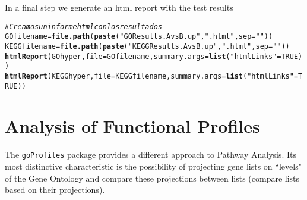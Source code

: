 \documentclass{article}\usepackage[]{graphicx}\usepackage[]{color}
\makeatletter
\newcommand{\hlnum}[1]{\textcolor[rgb]{0.686,0.059,0.569}{#1}}%
\newcommand{\hlstr}[1]{\textcolor[rgb]{0.192,0.494,0.8}{#1}}%
\newcommand{\hlcom}[1]{\textcolor[rgb]{0.678,0.584,0.686}{\textit{#1}}}%
\newcommand{\hlstd}[1]{\textcolor[rgb]{0.345,0.345,0.345}{#1}}%
\newcommand{\hlkwb}[1]{\textcolor[rgb]{0.69,0.353,0.396}{#1}}%
\newcommand{\hlkwc}[1]{\textcolor[rgb]{0.333,0.667,0.333}{#1}}%
\newcommand{\hlkwd}[1]{\textcolor[rgb]{0.737,0.353,0.396}{\textbf{#1}}}%
\newenvironment{kframe}{%
 \def\at@end@of@kframe{}%
 \ifinner\ifhmode%
  \def\at@end@of@kframe{\end{minipage}}%
  \begin{minipage}{\columnwidth}%
 \fi\fi%
 \def\FrameCommand##1{\hskip\@totalleftmargin \hskip-\fboxsep
 \colorbox{shadecolor}{##1}\hskip-\fboxsep
     \hskip-\linewidth \hskip-\@totalleftmargin \hskip\columnwidth}%
 \MakeFramed {\advance\hsize-\width
   \@totalleftmargin\z@ \linewidth\hsize
   \@setminipage}}%
 {\par\unskip\endMakeFramed%
 \at@end@of@kframe}
\newenvironment{knitrout}{}{} %
\makeatother
\begin{document}
In a final step we generate an html report with the test results

\begin{knitrout}
\color{fgcolor}\begin{kframe}
\begin{alltt}
\hlcom{# Creamos un informe html con los resultados}
\hlstd{GOfilename} \hlkwb{=}\hlkwd{file.path}\hlstd{(}\hlkwd{paste}\hlstd{(}\hlstr{"GOResults.AvsB.up"}\hlstd{,}\hlstr{".html"}\hlstd{,} \hlkwc{sep}\hlstd{=}\hlstr{""}\hlstd{))}
\hlstd{KEGGfilename} \hlkwb{=}\hlkwd{file.path}\hlstd{(}\hlkwd{paste}\hlstd{(}\hlstr{"KEGGResults.AvsB.up"}\hlstd{,}\hlstr{".html"}\hlstd{,} \hlkwc{sep}\hlstd{=}\hlstr{""}\hlstd{))}
\hlkwd{htmlReport}\hlstd{(GOhyper,} \hlkwc{file} \hlstd{= GOfilename,} \hlkwc{summary.args}\hlstd{=}\hlkwd{list}\hlstd{(}\hlstr{"htmlLinks"}\hlstd{=}\hlnum{TRUE}\hlstd{))}
\hlkwd{htmlReport}\hlstd{(KEGGhyper,} \hlkwc{file} \hlstd{= KEGGfilename,} \hlkwc{summary.args}\hlstd{=}\hlkwd{list}\hlstd{(}\hlstr{"htmlLinks"}\hlstd{=}\hlnum{TRUE}\hlstd{))}
\end{alltt}
\end{kframe}
\end{knitrout}

\section{Analysis of Functional Profiles}

The \texttt{goProfiles} package provides a different approach to Pathway Analysis. Its most distinctive characteristic is the possibility of projecting gene lists on ``levels" of the Gene Ontology and compare these projections between lists (compare lists based on their projections).
\end{document}
